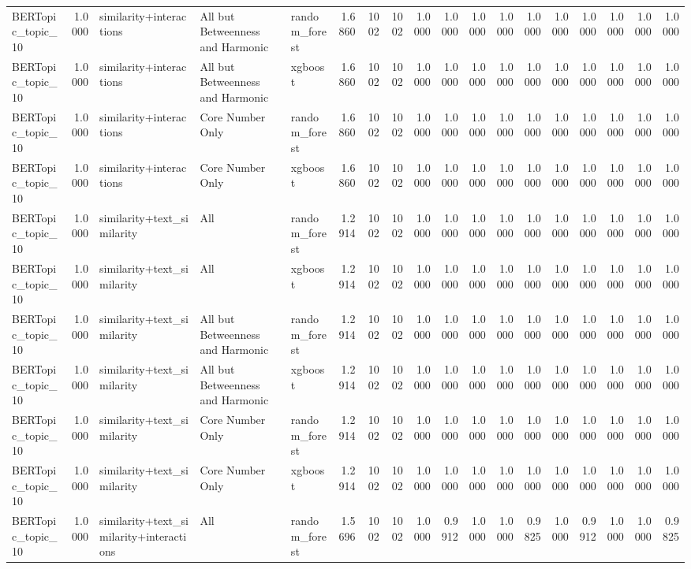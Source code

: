 \begin{tabular}{lrlllrrrrrrrrrrrrr}
BERTopic_topic_10 & 1.0000 & similarity+interactions & All but Betweenness and Harmonic & random_forest & 1.6860 & 1002 & 1002 & 1.0000 & 1.0000 & 1.0000 & 1.0000 & 1.0000 & 1.0000 & 1.0000 & 1.0000 & 1.0000 & 1.0000 \\
BERTopic_topic_10 & 1.0000 & similarity+interactions & All but Betweenness and Harmonic & xgboost & 1.6860 & 1002 & 1002 & 1.0000 & 1.0000 & 1.0000 & 1.0000 & 1.0000 & 1.0000 & 1.0000 & 1.0000 & 1.0000 & 1.0000 \\
BERTopic_topic_10 & 1.0000 & similarity+interactions & Core Number Only & random_forest & 1.6860 & 1002 & 1002 & 1.0000 & 1.0000 & 1.0000 & 1.0000 & 1.0000 & 1.0000 & 1.0000 & 1.0000 & 1.0000 & 1.0000 \\
BERTopic_topic_10 & 1.0000 & similarity+interactions & Core Number Only & xgboost & 1.6860 & 1002 & 1002 & 1.0000 & 1.0000 & 1.0000 & 1.0000 & 1.0000 & 1.0000 & 1.0000 & 1.0000 & 1.0000 & 1.0000 \\
BERTopic_topic_10 & 1.0000 & similarity+text_similarity & All & random_forest & 1.2914 & 1002 & 1002 & 1.0000 & 1.0000 & 1.0000 & 1.0000 & 1.0000 & 1.0000 & 1.0000 & 1.0000 & 1.0000 & 1.0000 \\
BERTopic_topic_10 & 1.0000 & similarity+text_similarity & All & xgboost & 1.2914 & 1002 & 1002 & 1.0000 & 1.0000 & 1.0000 & 1.0000 & 1.0000 & 1.0000 & 1.0000 & 1.0000 & 1.0000 & 1.0000 \\
BERTopic_topic_10 & 1.0000 & similarity+text_similarity & All but Betweenness and Harmonic & random_forest & 1.2914 & 1002 & 1002 & 1.0000 & 1.0000 & 1.0000 & 1.0000 & 1.0000 & 1.0000 & 1.0000 & 1.0000 & 1.0000 & 1.0000 \\
BERTopic_topic_10 & 1.0000 & similarity+text_similarity & All but Betweenness and Harmonic & xgboost & 1.2914 & 1002 & 1002 & 1.0000 & 1.0000 & 1.0000 & 1.0000 & 1.0000 & 1.0000 & 1.0000 & 1.0000 & 1.0000 & 1.0000 \\
BERTopic_topic_10 & 1.0000 & similarity+text_similarity & Core Number Only & random_forest & 1.2914 & 1002 & 1002 & 1.0000 & 1.0000 & 1.0000 & 1.0000 & 1.0000 & 1.0000 & 1.0000 & 1.0000 & 1.0000 & 1.0000 \\
BERTopic_topic_10 & 1.0000 & similarity+text_similarity & Core Number Only & xgboost & 1.2914 & 1002 & 1002 & 1.0000 & 1.0000 & 1.0000 & 1.0000 & 1.0000 & 1.0000 & 1.0000 & 1.0000 & 1.0000 & 1.0000 \\
BERTopic_topic_10 & 1.0000 & similarity+text_similarity+interactions & All & random_forest & 1.5696 & 1002 & 1002 & 1.0000 & 0.9912 & 1.0000 & 1.0000 & 0.9825 & 1.0000 & 0.9912 & 1.0000 & 1.0000 & 0.9825 \\

\end{tabular}
